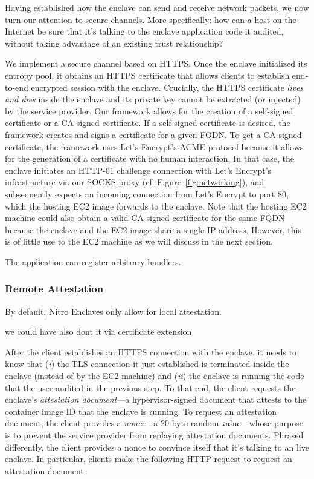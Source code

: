 Having established how the enclave can send and receive network packets, we now
turn our attention to secure channels.  More specifically: how can a host on
the Internet be sure that it's talking to the enclave application code it
audited, without taking advantage of an existing trust relationship?

We implement a secure channel based on HTTPS.  Once the enclave initialized its
entropy pool, it obtains an HTTPS certificate that allows clients to establish
end-to-end encrypted session with the enclave.  Crucially, the HTTPS
certificate \emph{lives and dies} inside the enclave and its private key cannot
be extracted (or injected) by the service provider.  Our framework allows for
the creation of a self-signed certificate or a CA-signed certificate.  If a
self-signed certificate is desired, the framework creates and signs a
certificate for a given FQDN.  To get a CA-signed certificate, the framework
uses Let's Encrypt's ACME protocol because it allows for the generation of a
certificate with no human interaction.  In that case, the enclave initiates an
HTTP-01 challenge connection with Let's Encrypt's infrastructure via our SOCKS
proxy (cf. Figure~\ref{fig:networking}), and subsequently expects an incoming
connection from Let's Encrypt to port 80, which the hosting EC2 image forwards
to the enclave.  Note that the hosting EC2 machine could also obtain a valid
CA-signed certificate for the same FQDN because the enclave and the EC2 image
share a single IP address.  However, this is of little use to the EC2 machine
as we will discuss in the next section.

The application can register arbitrary handlers.


\subsubsection{Remote Attestation}
\label{sec:attestation}

By default, Nitro Enclaves only allow for local attestation.

we could have also dont it via certificate extension~\cite[\S~3.2]{Knauth2019a}

After the client establishes an HTTPS connection with the enclave, it needs to
know that (\emph{i}) the TLS connection it just established is terminated
inside the enclave (instead of by the EC2 machine) and (\emph{ii}) the enclave
is running the code that the user audited in the previous step.  To that end,
the client requests the enclave's \emph{attestation document}---a
hypervisor-signed document that attests to the container image ID that the
enclave is running.  To request an attestation document, the client provides a
\emph{nonce}---a 20-byte random value---whose purpose is to prevent the service
provider from replaying attestation documents.  Phrased differently, the client
provides a nonce to convince itself that it's talking to an live enclave.  In
particular, clients make the following HTTP request to request an attestation
document:


